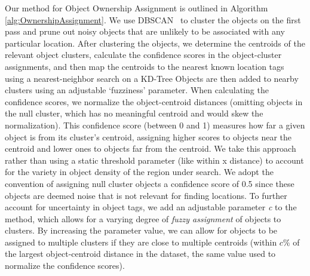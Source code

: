 Our method for Object Ownership Assignment is outlined in Algorithm \ref{alg:OwnershipAssignment}. 
We use DBSCAN~\cite{Ester1996} to cluster the objects on the first pass and prune out noisy objects that are unlikely to be associated with any particular location.
After clustering the objects, we determine the centroids of the relevant object clusters, calculate the confidence scores in the object-cluster assignments, and then map the centroids to the nearest known location tags using a nearest-neighbor search on a KD-Tree
Objects are then added to nearby clusters using an adjustable `fuzziness' parameter.
When calculating the confidence scores, we normalize the object-centroid distances (omitting objects in the null cluster, which has no meaningful centroid and would skew the normalization). 
This confidence score (between 0 and 1) measures how far a given object is from its cluster's centroid, assigning higher scores to objects near the centroid and lower ones to objects far from the centroid. 
We take this approach rather than using a static threshold parameter (like within x distance) to account for the variety in object density of the region under search. 
We adopt the convention of assigning null cluster objects a confidence score of 0.5 since these objects are deemed noise that is not relevant for finding locations.
To further account for uncertainty in object tags, we add an adjustable parameter \textit{c} to the method, which allows for a varying degree of \textit{fuzzy assignment} of objects to clusters. 
By increasing the parameter value, we can allow for objects to be assigned to multiple clusters if they are close to multiple centroids (within \textit{$c\%$} of the largest object-centroid distance in the dataset, the same value used to normalize the confidence scores). %


